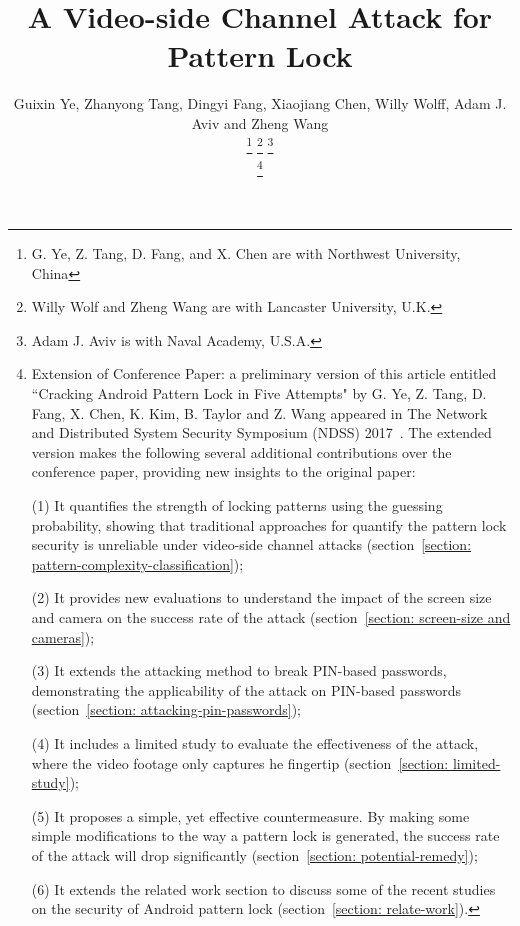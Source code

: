 \documentclass[journal,table,twoside]{IEEEtran}
\begin{document}
\title{A Video-side Channel Attack for Pattern Lock}
\author{Guixin Ye, Zhanyong Tang, Dingyi Fang, Xiaojiang Chen,
        Willy Wolff, Adam J. Aviv and Zheng Wang

    \thanks{G. Ye, Z. Tang, D. Fang, and X. Chen are with Northwest University, China}%
    \thanks{Willy Wolf and Zheng Wang are with Lancaster University, U.K.}
    \thanks{Adam J. Aviv is with Naval Academy, U.S.A.}

    \thanks{
            Extension of Conference Paper: a preliminary version of this article entitled ``Cracking Android Pattern Lock
            in Five Attempts" by G. Ye, Z. Tang, D. Fang, X. Chen, K. Kim, B. Taylor and Z. Wang appeared in
            The Network and Distributed System Security Symposium (NDSS) 2017~\cite{ye2017cracking}.
            The extended version makes the following several additional contributions over the conference
            paper, providing new insights to the original paper:
            
            
            (1)	It quantifies the strength of locking patterns using the guessing probability, showing that traditional approaches for quantify the pattern lock security is unreliable under video-side channel attacks (section~\ref{section: pattern-complexity-classification});
            
            
            (2)	It provides new evaluations to understand the impact of the screen size and camera on the success rate of the attack (section~\ref{section: screen-size and cameras});
            
            
            (3)	It extends the attacking method to break PIN-based passwords, demonstrating the applicability of the attack on PIN-based passwords (section~\ref{section: attacking-pin-passwords});
            
            
            (4)	It includes a limited study to evaluate the effectiveness of the attack, where the video footage only captures he fingertip (section~\ref{section: limited-study});
            
            
            (5)	It proposes a simple, yet effective countermeasure. By making some simple modifications to the way a pattern lock is generated, the success rate of the attack will drop significantly (section~\ref{section: potential-remedy});
           
           
            (6)	It extends the related work section to discuss some of the recent studies on the security of Android pattern lock (section~\ref{section: relate-work}).

    }
}
\end{document}
